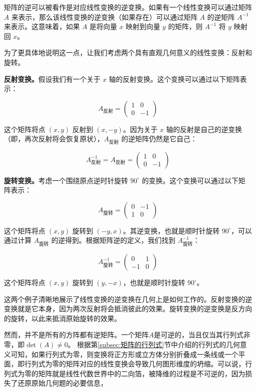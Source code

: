 矩阵的逆可以被看作是对应线性变换的逆变换。如果有一个线性变换可以通过矩阵 \(A\) 来表示，那么该线性变换的逆变换（如果存在）可以通过矩阵 \(A\) 的逆矩阵 \(A^{-1}\) 来表示。这意味着，如果 \(A\) 是将向量 \(x\) 映射到向量 \(y\) 的矩阵，则 \(A^{-1}\) 将 \(y\) 映射回 \(x\)。

为了更具体地说明这一点，让我们考虑两个具有直观几何意义的线性变换：反射和旋转。

\textbf{反射变换。}假设我们有一个关于 \(x\) 轴的反射变换。这个变换可以通过以下矩阵表示：

\[ A_{\text{反射}} = \begin{pmatrix} 1 & 0 \\ 0 & -1 \end{pmatrix} \]

这个矩阵将点 \( (x, y) \) 反射到 \( (x, -y) \)。因为关于 \(x\) 轴的反射是自己的逆变换（即，再次反射将会恢复原状），\(A_{\text{反射}}\) 的逆矩阵仍然是它自己：

\[ A_{\text{反射}}^{-1} = A_{\text{反射}} = \begin{pmatrix} 1 & 0 \\ 0 & -1 \end{pmatrix} \]

\textbf{旋转变换。}考虑一个围绕原点逆时针旋转 \(90^\circ\) 的变换。这个变换可以通过以下矩阵表示：

\[ A_{\text{旋转}} = \begin{pmatrix} 0 & -1 \\ 1 & 0 \end{pmatrix} \]

这个矩阵将点 \( (x, y) \) 旋转到 \( (-y, x) \)。其逆变换，也就是顺时针旋转 \(90^\circ\)，可以通过计算 \(A_{\text{旋转}}\) 的逆得到。根据矩阵逆的定义，我们找到 \(A_{\text{旋转}}^{-1}\)：

\[ A_{\text{旋转}}^{-1} = \begin{pmatrix} 0 & 1 \\ -1 & 0 \end{pmatrix} \]

这个矩阵将点 \( (x, y) \) 旋转到 \( (y, -x) \)，也就是顺时针旋转 \(90^\circ\)。

这两个例子清晰地展示了线性变换的逆变换在几何上是如何工作的。反射变换的逆变换就是它本身，因为两次反射将会抵消彼此的效果。旋转变换的逆变换是反方向的旋转，以此来抵消原始旋转的效果。

然而，并不是所有的方阵都有逆矩阵。一个矩阵$A$是可逆的，当且仅当其行列式非零，即$\det(A)\neq 0$。
根据第\ref{subsec:矩阵的行列式}节中介绍的行列式的几何意义可知，如果行列式为零，则变换将正方形或立方体分别折叠成一条线或一个平面，即行列式为零的矩阵对应的线性变换会导致几何图形维度的坍缩。可以说，行列式为零的矩阵就是线性代数世界中的二向箔，被降维的过程是不可逆的，因为损失了还原原始几何题的必要信息，

